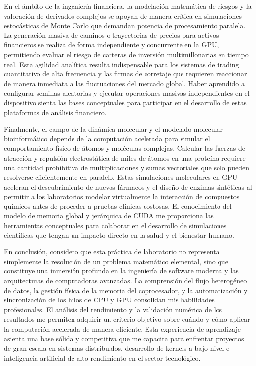 En el ámbito de la ingeniería financiera, la modelación matemática de riesgos y la valoración de derivados complejos se apoyan de manera crítica en simulaciones estocásticas de Monte Carlo que demandan potencia de procesamiento paralela. La generación masiva de caminos o trayectorias de precios para activos financieros se realiza de forma independiente y concurrente en la GPU, permitiendo evaluar el riesgo de carteras de inversión multimillonarias en tiempo real. Esta agilidad analítica resulta indispensable para los sistemas de trading cuantitativo de alta frecuencia y las firmas de corretaje que requieren reaccionar de manera inmediata a las fluctuaciones del mercado global. Haber aprendido a configurar semillas aleatorias y ejecutar operaciones masivas independientes en el dispositivo sienta las bases conceptuales para participar en el desarrollo de estas plataformas de análisis financiero.

Finalmente, el campo de la dinámica molecular y el modelado molecular bioinformático depende de la computación acelerada para simular el comportamiento físico de átomos y moléculas complejas. Calcular las fuerzas de atracción y repulsión electrostática de miles de átomos en una proteína requiere una cantidad prohibitiva de multiplicaciones y sumas vectoriales que solo pueden resolverse eficientemente en paralelo. Estas simulaciones moleculares en GPU aceleran el descubrimiento de nuevos fármacos y el diseño de enzimas sintéticas al permitir a los laboratorios modelar virtualmente la interacción de compuestos químicos antes de proceder a pruebas clínicas costosas. El conocimiento del modelo de memoria global y jerárquica de CUDA me proporciona las herramientas conceptuales para colaborar en el desarrollo de simulaciones científicas que tengan un impacto directo en la salud y el bienestar humano.

En conclusión, considero que esta práctica de laboratorio no representa simplemente la resolución de un problema matemático elemental, sino que constituye una inmersión profunda en la ingeniería de software moderna y las arquitecturas de computadoras avanzadas. La comprensión del flujo heterogéneo de datos, la gestión física de la memoria del coprocesador, y la automatización y sincronización de los hilos de CPU y GPU consolidan mis habilidades profesionales. El análisis del rendimiento y la validación numérica de los resultados me permiten adquirir un criterio objetivo sobre cuándo y cómo aplicar la computación acelerada de manera eficiente. Esta experiencia de aprendizaje asienta una base sólida y competitiva que me capacita para enfrentar proyectos de gran escala en sistemas distribuidos, desarrollo de kernels a bajo nivel e inteligencia artificial de alto rendimiento en el sector tecnológico.

